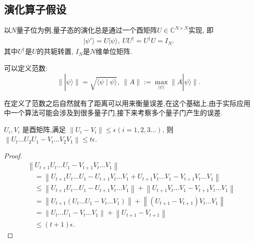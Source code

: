 \subsection{演化算子假设}\label{sec3}
以$N$量子位为例,量子态的演化总是通过一个酉矩阵$U \in \mathbb{C}^{N\times N}$实现, 即
\begin{align*}
	|\psi'\rangle = U|\psi\rangle, ~ UU^\dagger = U^\dagger U = I_N.
\end{align*}
其中$U^\dagger$是$U$的共轭转置, $I_N$是$N$维单位矩阵.

可以定义范数:
\begin{equation}
    \||\psi\rangle \|=\sqrt{\langle\psi \mid \psi\rangle},~
	 \|A\|:=\max _{|\psi\rangle}\| A|\psi\rangle \|.
\end{equation}


在定义了范数之后自然就有了距离可以用来衡量误差,在这个基础上,由于实际应用中一个算法可能会涉及到很多量子门,接下来考察多个量子门产生的误差.
\begin{lemma} \label{thm:the1}
	$U_i, V_i$ 是酉矩阵,满足 $\left\|U_i-V_i\right\| \leq \epsilon(i=1,2,3...)$,  则$\left\|U_t \ldots U_2 U_1-V_t \ldots V_2 V_1\right\| \leq t \epsilon$.
\end{lemma}
\begin{proof}
	$$
	\begin{aligned}
		& \left\|U_{t+1} U_t \ldots U_1-V_{t+1} V_t \ldots V_1\right\| \\
		& \quad=\left\|U_{t+1} U_t \ldots U_1-U_{t+1} V_t \ldots V_1+U_{t+1} V_t \ldots V_1-V_{t+1} V_t \ldots V_1\right\| \\
		& \quad \leq\left\|U_{t+1} U_t \ldots U_1-U_{t+1} V_t \ldots V_1\right\|+\left\|U_{t+1} V_t \ldots V_1-V_{t+1} V_t \ldots V_1\right\| \\
		& \quad=\left\|U_{t+1}\left(U_t \ldots U_1-V_t \ldots V_1\right)\right\|+\left\|\left(U_{t+1}-V_{t+1}\right) V_t \ldots V_1\right\| \\
		& \quad=\left\|U_t \ldots U_1-V_t \ldots V_1\right\|+\left\|U_{t+1}-V_{t+1}\right\| \\
		& \quad \leq(t+1) \epsilon.
	\end{aligned}
	$$
\end{proof}


